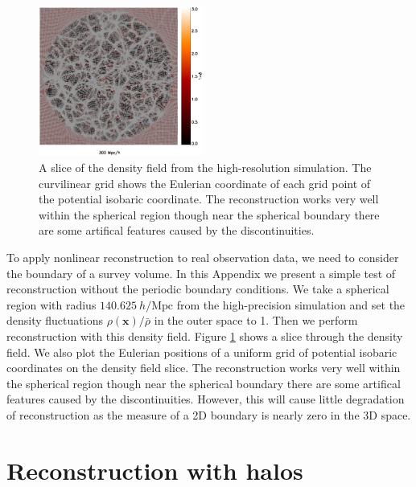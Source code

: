 \documentclass[aps,prx,twocolumn,superscriptaddress,groupedaddress,nofootinbib,amsfont]{revtex4}  %
\newcommand{\mr}{\mathrm}
\newcommand{\bmx}{\bm{x}}
\begin{document}
\begin{figure}[tbp]
\vspace{-0.7cm}
\begin{center}
\includegraphics[width=0.48\textwidth]{map0512-0256-all.eps}
\end{center}
\vspace{-0.7cm}
\caption{A slice of the density field from the high-resolution simulation. 
The curvilinear grid shows the Eulerian coordinate of each grid point of the 
potential isobaric coordinate. The reconstruction works very well within the 
spherical region though near the spherical boundary there are some artifical 
features caused by the discontinuities.}
\label{fig:mask}
\end{figure}

To apply nonlinear reconstruction to real observation data, we need to consider
the boundary of a survey volume. In this Appendix  we present a simple test of 
reconstruction without the periodic boundary conditions. We take a spherical 
region with radius $140.625\ h/\mr{Mpc}$ from the high-precision simulation and
set the density fluctuations $\rho(\bmx)/\bar{\rho}$ in the outer space to 1.
Then we perform reconstruction with this density field.
Figure \ref{fig:mask} shows a slice through the density field. We also plot the 
Eulerian positions of a uniform grid of potential isobaric coordinates on the
density field slice. The reconstruction works very well within the spherical
region though near the spherical boundary there are some artifical features
caused by the discontinuities. However, this will cause little degradation of 
reconstruction as the measure of a 2D boundary is nearly zero in the 3D space.

\section{Reconstruction with halos}
\label{appendix:D}
\end{document}
